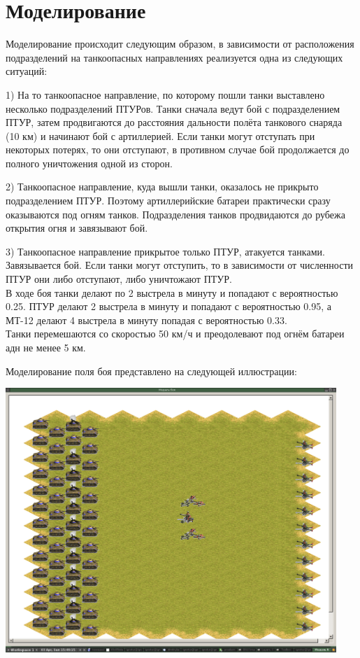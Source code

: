 \documentclass{cw1}
\begin{document}
\newpage
\section{Моделирование}
Моделирование происходит следующим образом, в зависимости от расположения подразделений на танкоопасных направлениях 
реализуется одна из следующих ситуаций:


1) На то танкоопасное направление, по которому пошли танки выставлено несколько
подразделений ПТУРов. Танки сначала ведут бой с подразделением ПТУР, затем продвигаются до
расстояния дальности полёта танкового снаряда (10 км) и начинают бой с артиллерией.
Если танки могут отступать при некоторых потерях, то они
отступают, в противном случае бой продолжается до полного уничтожения одной из сторон.

2) Танкоопасное направление, куда вышли танки, оказалось не прикрыто подразделением ПТУР.
Поэтому артиллерийские батареи практически сразу оказываются под огням танков.
Подразделения танков продвидаются до рубежа открытия огня и завязывают бой.

3) Танкоопасное направление прикрытое только ПТУР, атакуется танками. Завязывается бой.
Если танки могут отступить, то в зависимости от численности ПТУР они либо отступают, либо
уничтожают ПТУР.
\\
В ходе боя танки делают по 2 выстрела в минуту и попадают с вероятностью 0.25. ПТУР делают
2 выстрела в минуту и попадают с вероятностью 0.95, а МТ-12 делают 4 выстрела в минуту
попадая с вероятностью 0.33.\\
Танки перемешаются со скоростью 50 км/ч и преодолевают под огнём батареи адн не менее 5
км.

Моделирование поля боя представлено на следующей иллюстрации:

\begin{center}
\includegraphics[height=100mm]{img2.png}
\end{center}
\end{document}
